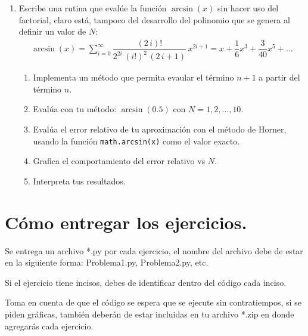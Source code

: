 \documentclass[11pt]{article}
\begin{document}
\begin{enumerate}
\item Escribe una rutina que evalúe la función $\arcsin (x)$ sin hacer uso del factorial, claro está, tampoco del desarrollo del polinomio que se genera al definir un valor de $N$:
\begin{align*}
\arcsin (x) = \sum_{i=0}^{\infty} \dfrac{(2 \, i)!}{2^{2 i} \, (i!)^{2} \, (2 \, i + 1)} \, x^{2i+1} = x + \dfrac{1}{6} x^{3} + \dfrac{3}{40} x^{5} + \ldots
\end{align*}
\begin{enumerate}
\item Implementa un método que permita evaular el término $n+1$ a partir del término $n$.
\item Evalúa con tu método: $\arcsin(0.5)$ con $N = 1, 2, \ldots, 10$.
\item Evalúa el error relativo de tu aproximación con el método de Horner, usando la función \texttt{math.arcsin(x)} como el valor exacto.
\item Grafica el comportamiento del error relativo vs $N$.
\item Interpreta tus resultados.
\end{enumerate}
\end{enumerate}
\section*{Cómo entregar los ejercicios.}
Se entrega un archivo *.py por cada ejercicio, el nombre del archivo debe de estar en la siguiente forma: Problema1.py, Problema2.py, etc.
\par
Si el ejercicio tiene incisos, debes de identificar dentro del código cada inciso.
\par
Toma en cuenta de que el código se espera que se ejecute sin contratiempos, si se piden gráficas, también deberán de estar incluidas en tu archivo *.zip en donde agregarás cada ejercicio.
\end{document}
